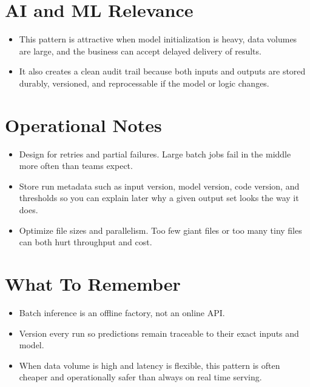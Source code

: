 \documentclass[10pt,twocolumn]{article}
\begin{document}
\section*{AI and ML Relevance}
\begin{itemize}
\item This pattern is attractive when model initialization is heavy, data volumes are large, and the business can accept delayed delivery of results.
\item It also creates a clean audit trail because both inputs and outputs are stored durably, versioned, and reprocessable if the model or logic changes.
\end{itemize}

\section*{Operational Notes}
\begin{itemize}
\item Design for retries and partial failures. Large batch jobs fail in the middle more often than teams expect.
\item Store run metadata such as input version, model version, code version, and thresholds so you can explain later why a given output set looks the way it does.
\item Optimize file sizes and parallelism. Too few giant files or too many tiny files can both hurt throughput and cost.
\end{itemize}

\section*{What To Remember}
\begin{itemize}
\item Batch inference is an offline factory, not an online API.
\item Version every run so predictions remain traceable to their exact inputs and model.
\item When data volume is high and latency is flexible, this pattern is often cheaper and operationally safer than always on real time serving.
\end{itemize}
\end{document}
